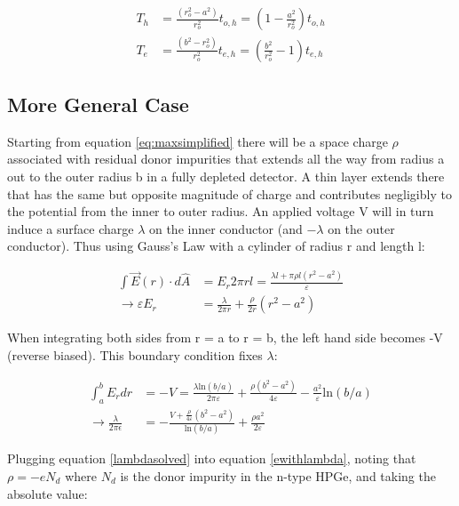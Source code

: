 \begin{equation}
\begin{aligned} \label{times}
  T_{h} &= \frac{(r_{o}^{2} - a^{2})}{r_{o}^2}t_{o,h} = \left(1 - \frac{a^2}{r_{o}^2} \right)t_{o,h}\\
  T_{e} &= \frac{(b^{2} - r_{o}^{2})}{r_{o}^2}t_{e,h} = \left(\frac{b^2}{r_{o}^2}-1 \right)t_{e,h}
\end{aligned}
\end{equation}

\subsection*{More General Case}

Starting from equation \ref{eq:maxsimplified} there will be a space charge $\rho$ associated with residual donor impurities that extends all the way from radius a out to the outer radius b in a fully depleted detector. A thin layer extends there that has the same but opposite magnitude of charge and contributes negligibly to the potential from the inner to outer radius. An applied voltage V will in turn induce a surface charge $\lambda$ on the inner conductor (and $-\lambda$ on the outer conductor). Thus using Gauss's Law with a cylinder of radius r and length l:

\begin{align}
    \int \vec{E}(r) \cdot d\hat{A} &= E_{r}2\pi r l = \frac{\lambda l + \pi \rho l (r^2 - a^2)}{\varepsilon} \label{electric_field}\\
    \rightarrow \varepsilon E_{r} &= \frac{\lambda}{2\pi r} + \frac{\rho}{2r}(r^2-a^2) \label{ewithlambda}
\end{align}

When integrating both sides from r = a to r = b, the left hand side becomes -V (reverse biased). This boundary condition fixes $\lambda$:

\begin{align}
    \int_{a}^{b} E_{r}dr &= -V = \frac{\lambda \mathrm{ln}(b/a)}{2 \pi\varepsilon} + \frac{\rho(b^2-a^2)}{4\varepsilon} - \frac{a^2}{\varepsilon}\mathrm{ln}(b/a)\\
    \rightarrow \frac{\lambda}{2\pi\epsilon} &= -\frac{V + \frac{\rho}{4\varepsilon}(b^2-a^2)}{\mathrm{ln}(b/a)} + \frac{\rho a^2}{2\varepsilon} \label{lambdasolved}
\end{align}

Plugging equation \ref{lambdasolved} into equation \ref{ewithlambda}, noting that $\rho = -e N_{d}$ where $N_{d}$ is the donor impurity in the n-type HPGe, and taking the absolute value:

